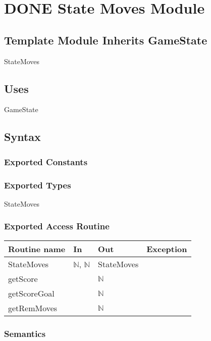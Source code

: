 \documentclass[11pt]{article}
\begin{document}
\section{{\bfseries\sffamily DONE} State Moves Module}
\label{sec:org9084762}
\subsection*{Template Module Inherits GameState}
\label{sec:orgadf16e4}
StateMoves

\subsection*{Uses}
\label{sec:org032a983}
GameState

\subsection*{Syntax}
\label{sec:org13f3c6d}

\subsubsection*{Exported Constants}
\label{sec:orgb40b07f}

\subsubsection*{Exported Types}
\label{sec:orgc9e82c1}
StateMoves

\subsubsection*{Exported Access Routine}
\label{sec:org40dfc37}
\begin{center}
\begin{tabular}{l|l|l|l|}
Routine name & In & Out & Exception\\
\hline
StateMoves & \(\mathbb{N}\), \(\mathbb{N}\) & StateMoves & \\
getScore &  & \(\mathbb{N}\) & \\
getScoreGoal &  & \(\mathbb{N}\) & \\
getRemMoves &  & \(\mathbb{N}\) & \\
\end{tabular}
\end{center}

\subsubsection*{Semantics}
\label{sec:orgb23e0c1}
\end{document}
